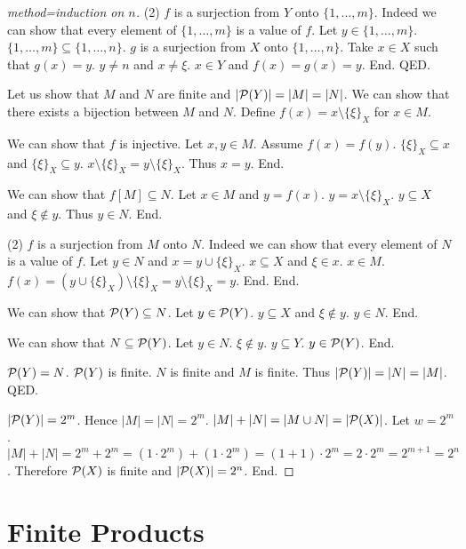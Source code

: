 \documentclass{article}
\newcommand{\Seq}[2]{\{#1,\dots,#2\}}
\newcommand{\pow}{{\cal P}}
\newcommand{\sset}[2]{\{#1\}_{#2}}
\begin{document}
\begin{forthel}
\begin{proof}[method=induction on $n$]
      (2) $f$ is a surjection from $Y$ onto $\Seq{1}{m}$.
      Indeed we can show that every element of $\Seq{1}{m}$ is a value of $f$.
        Let $y \in \Seq{1}{m}$. $\Seq{1}{m} \subseteq \Seq{1}{n}$. $g$ is a surjection from $X$ onto $\Seq{1}{n}$.
        Take $x \in X$ such that $g(x) = y$. $y \neq n$ and $x \neq \xi$. $x \in Y$ and $f(x) = g(x) = y$. End.
    QED.


    Let us show that $M$ and $N$ are finite and $|\pow(Y)| = |M| = |N|$.
      We can show that there exists a bijection between $M$ and $N$.
        Define $f(x) = x \setminus \sset{\xi}{X}$ for $x \in M$.

        We can show that $f$ is injective.
          Let $x,y \in M$. Assume $f(x) = f(y)$. $\sset{\xi}{X} \subseteq x$ and $\sset{\xi}{X} \subseteq y$.
          $x \setminus \sset{\xi}{X} = y \setminus \sset{\xi}{X}$. Thus $x = y$. End.

        We can show that $f[M] \subseteq N$.
          Let $x \in M$ and $y = f(x)$. $y = x \setminus \sset{\xi}{X}$. $y \subseteq X$ and $\xi \notin y$. Thus $y \in N$. End.

        (2) $f$ is a surjection from $M$ onto $N$.
        Indeed we can show that every element of $N$ is a value of $f$.
          Let $y \in N$ and $x = y \cup \sset{\xi}{X}$. $x \subseteq X$ and $\xi \in x$. $x \in M$.
          $f(x) = (y \cup \sset{\xi}{X}) \setminus \sset{\xi}{X} = y \setminus \sset{\xi}{X} = y$. End.
      End.

      We can show that $\pow(Y) \subseteq N$.
        Let $y \in \pow(Y)$. $y \subseteq X$ and $\xi \notin y$. $y \in N$. End.

      We can show that $N \subseteq \pow(Y)$.
        Let $y \in N$. $\xi \notin y$. $y \subseteq Y$. $y \in \pow(Y)$. End.


      $\pow(Y) = N$. $\pow(Y)$ is finite. $N$ is finite and $M$ is finite.
      Thus $|\pow(Y)| = |N| = |M|$.
    QED.

    $|\pow(Y)| = 2^{m}$. Hence $|M| = |N| = 2^{m}$. $|M| + |N| = |M \cup N| = |\pow(X)|$. Let $w = 2^{m}$.
    $|M| + |N| = 2^{m} + 2^{m} = (1 \cdot 2^{m}) + (1 \cdot 2^{m}) = (1 + 1) \cdot 2^{m} =  2 \cdot 2^{m} = 2^{m+1} = 2^{n}$.
    Therefore $\pow(X)$ is finite and $|\pow(X)| = 2^{n}$.
  End.
  \end{proof}

  \end{forthel}



\section{Finite Products}
\end{document}
